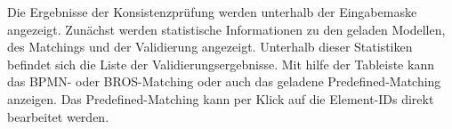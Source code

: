 Die Ergebnisse der Konsistenzprüfung werden unterhalb der Eingabemaske angezeigt.
Zunächst werden statistische Informationen zu den geladen Modellen, des Matchings und der Validierung angezeigt.
Unterhalb dieser Statistiken befindet sich die Liste der Validierungsergebnisse.
Mit hilfe der Tableiste kann das BPMN- oder BROS-Matching oder auch das geladene Predefined-Matching anzeigen.
Das Predefined-Matching kann per Klick auf die Element-IDs direkt bearbeitet werden.
